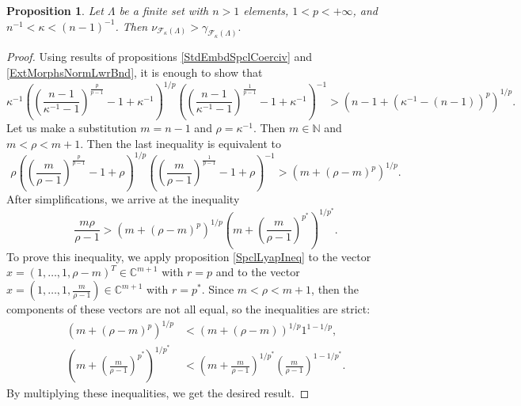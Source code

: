 \documentclass[12pt]{article}
\newtheorem{proposition}[theorem]{Proposition}
\begin{document}
\begin{proposition}\label{CompStdEmbdCoercvAndExtMorphsNormInf}
    Let $\Lambda$ be a finite set with $n>1$ elements, $1<p<+\infty$, 
    and $n^{-1}<\kappa<(n-1)^{-1}$. Then
    $
    \nu_{\mathcal{F}_{\kappa}(\Lambda)}
    >
    \gamma_{\mathcal{F}_{\kappa}(\Lambda)}.
    $
\end{proposition}
\begin{proof}
    Using results of propositions \ref{StdEmbdSpclCoerciv} 
    and \ref{ExtMorphsNormLwrBnd}, it is enough to show that
    \[
        \kappa^{-1}
        \left(
            \left(\frac{n-1}{\kappa^{-1}-1}
            \right)^{\frac{p}{p-1}}
            -1+\kappa^{-1}
        \right)^{1/p}
        \left(
            \left(\frac{n-1}{\kappa^{-1}-1}
            \right)^{\frac{1}{p-1}}
            -1+\kappa^{-1}
        \right)^{-1}
        >
        (n-1+(\kappa^{-1}-(n-1))^p)^{1/p}.
    \]
    Let us make a substitution $m=n-1$ and $\rho=\kappa^{-1}$. 
    Then $m\in\mathbb{N}$ and $m<\rho<m+1$. Then the last inequality is 
    equivalent to
    \[
        \rho
        \left(
        \left(\frac{m}{\rho-1}
            \right)^{\frac{p}{p-1}}
            -1+\rho
        \right)^{1/p}
        \left(
            \left(\frac{m}{\rho-1}
            \right)^{\frac{1}{p-1}}
            -1+\rho
        \right)^{-1}
        >
        (m+(\rho-m)^p)^{1/p}.
    \] 
    After simplifications, we arrive at the inequality
    \[
        \frac{m\rho}{\rho-1}
        >
        (m+(\rho-m)^p)^{1/p}
        \left(
            m+\left(\frac{m}{\rho-1}\right)^{p^*}
        \right)^{1/p^*}.
    \]
    To prove this inequality, we apply proposition \ref{SpclLyapIneq} to the 
    vector $x=(1,\ldots,1,\rho-m)^T\in\mathbb{C}^{m+1}$ with $r=p$ and to the 
    vector $x=(1,\ldots,1,\frac{m}{\rho-1})\in\mathbb{C}^{m+1}$ with $r=p^*$. 
    Since $m<\rho<m+1$, then the components of these vectors are not all equal,
    so the inequalities are strict:
    \[
    \begin{aligned}
        (m+(\rho-m)^p)^{1/p}
        &<
        (m+(\rho-m))^{1/p} 1^{1-1/p},\\
        \left(m+\left(\frac{m}{\rho-1}\right)^{p^*}\right)^{1/p^*}
        &<
        \left(m+\frac{m}{\rho-1}\right)^{1/p^*}
        \left(\frac{m}{\rho-1}\right)^{1-1/p^*}.
    \end{aligned}
    \]
    By multiplying these inequalities, we get the desired result.
\end{proof}
\end{document}
